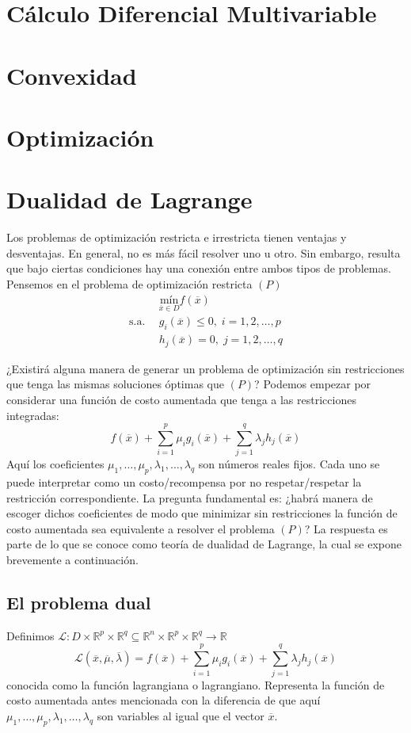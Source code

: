 \documentclass[11pt]{report}
\newcommand{\Rn}{\mathbb{R}^{n}}
\newcommand{\Rp}{\mathbb{R}^{p}}
\newcommand{\Rq}{\mathbb{R}^{q}}
\newcommand{\R}{\mathbb{R}}
\newcommand{\mv}{\overline{\mu}}
\newcommand{\lv}{\overline{\lambda}}
\newcommand{\x}{\overline{x}}
\newcommand{\Sp}{1,2,\ldots, p}
\newcommand{\Sq}{1,2,\ldots, q}
\newcommand{\La}{\mathcal{L}}
\begin{document}
\chapter{Cálculo Diferencial Multivariable}
\chapter{Convexidad}
\chapter{Optimización}
\chapter{Dualidad de Lagrange}
Los problemas de optimización restricta e irrestricta tienen ventajas y desventajas. En general, no es más fácil resolver uno u otro. Sin embargo, resulta que bajo ciertas condiciones hay una conexión entre ambos tipos de problemas.\\


Pensemos en el problema de optimización restricta $(P)$
\begin{equation*}
\begin{aligned}
& \underset{\x\in D}{\text{mín}} f(\x) \\
\text{s.a.}\ \
& g_i(\x) \leq 0, \; i = \Sp \\
& h_j(\x)=0, \; j=\Sq
\end{aligned}
\end{equation*}

\noindent
¿Existirá alguna manera de generar un problema de optimización sin restricciones que tenga las mismas soluciones óptimas que $(P)$? Podemos empezar por considerar una función de costo aumentada que tenga a las restricciones integradas:
$$f(\x)+\sum_{i=1}^{p}\mu_{i} g_{i}(\x) + \sum_{j=1}^{q}\lambda_{j} h_{j}(\x)$$
Aquí los coeficientes $\mu_{1},\ldots,\mu_{p}, \lambda_{1},\ldots,\lambda_{q}$ son números reales fijos. Cada uno se puede interpretar como un costo/recompensa por no respetar/respetar la restricción correspondiente. La pregunta fundamental es: ¿habrá manera de escoger dichos coeficientes de modo que minimizar sin restricciones la función de costo aumentada sea equivalente a resolver el problema $(P)$? La respuesta es parte de lo que se conoce como teoría de dualidad de Lagrange, la cual se expone brevemente a continuación.\\

\section{El problema dual}
Definimos $\La: D\times\Rp\times\Rq\subseteq\Rn\times\Rp\times\Rq\rightarrow\R$ $$\La(\x,\mv,\lv)=f(\x)+\sum_{i=1}^{p}\mu_{i} g_{i}(\x) + \sum_{j=1}^{q}\lambda_{j} h_{j}(\x)$$
conocida como la función lagrangiana o lagrangiano. Representa la función de costo aumentada antes mencionada con la diferencia de que aquí $\mu_{1},\ldots,\mu_{p}, \lambda_{1},\ldots,\lambda_{q}$ son variables al igual que el vector $\x$.\\
\end{document}
